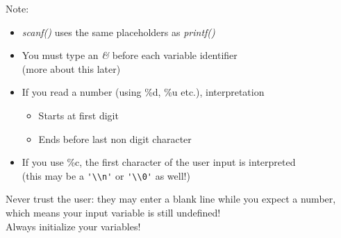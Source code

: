 \begin{frame}{Note:}
    \begin{itemize}
        \item \textit{scanf()} uses the same placeholders as \textit{printf()}
        \item You must type an \textit{\&} before each variable identifier \\
            (more about this later)
        \item If you read a number (using \%d, \%u etc.), interpretation
        \begin{itemize}
            \item Starts at first digit
            \item Ends before last non digit character
        \end{itemize}
        \item If you use \%c, the first character of the user input is interpreted\\
        (this may be a \lstinline{'\\n'} or \lstinline{'\\0'} as well!)
    \end{itemize}
    Never trust the user: they may enter a blank line while you expect a number, which means your input variable is still undefined!\\
    Always initialize your variables!
\end{frame}


